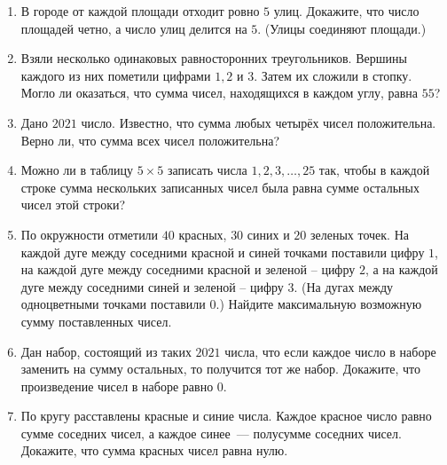 \documentclass{article}
\begin{document}
\begin{enumerate}[label*=\protect\fbox{\arabic{enumi}}]
\item В городе от каждой площади отходит ровно $5$ улиц. Докажите, что число площадей четно, а число улиц делится на $5$. (Улицы соединяют площади.)

\item Взяли несколько одинаковых равносторонних треугольников. Вершины каждого из них пометили цифрами $1, 2$ и $3$. Затем их сложили в стопку. Могло ли оказаться, что сумма чисел, находящихся в каждом углу, равна $55$?

\item Дано $2021$ число. Известно, что сумма любых четырёх чисел положительна. Верно ли, что сумма всех чисел положительна?

\item Можно ли в таблицу $5 \times 5$ записать числа $1, 2, 3,
\dots, 25$ так, чтобы в каждой строке сумма нескольких
записанных чисел была равна сумме остальных чисел
этой строки?

\item По окружности отметили $40$ красных, $30$ синих и $20$ зеленых точек. На каждой дуге между соседними красной и синей точками поставили цифру $1$, на каждой дуге между соседними красной и зеленой – цифру $2$, а на каждой дуге между соседними синей и зеленой – цифру $3$. (На дугах между одноцветными точками поставили $0$.) Найдите максимальную возможную сумму поставленных чисел.

\item Дан набор, состоящий из таких $2021$ числа, что если каждое число в наборе заменить на сумму остальных, то получится тот же набор. 
Докажите, что произведение чисел в наборе равно $0$.

\item По кругу расставлены красные и синие числа. Каждое красное число равно сумме соседних чисел, а каждое синее~--- полусумме соседних чисел. Докажите, что сумма красных чисел равна нулю. 





\end{enumerate}
\end{document}
